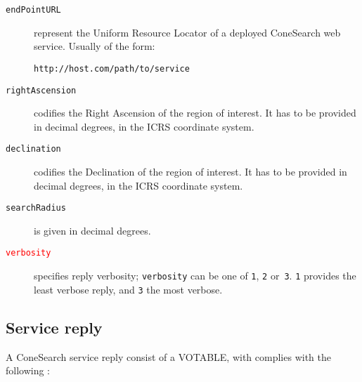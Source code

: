 	\begin{description}
		\item[\texttt{endPointURL}] represent the Uniform Resource 
		Locator of a deployed ConeSearch web service. 
		Usually of the form:
		
		\texttt{http://host.com/path/to/service}

		\item[\texttt{rightAscension}] codifies the Right Ascension 
		of the region of interest. It has to be provided in decimal 
		degrees, in the ICRS coordinate system.

		\item[\texttt{declination}] codifies the Declination of the 
		region of interest. It has to be provided in decimal 
		degrees, in the ICRS coordinate system.

		\item[\texttt{searchRadius}] is given in decimal degrees.

		\item[\textcolor{red}{\texttt{verbosity}}] specifies reply
        verbosity; \texttt{verbosity} can be one of \texttt{1},
        \texttt{2} or~\texttt{3}. \texttt{1} provides the least verbose
        reply, and \texttt{3} the most verbose.
	\end{description}
	
		
	\subsection{Service reply} %
	\label{sub:service_reply_scs}
	
	A ConeSearch service reply consist of a VOTABLE, with complies with 
	the following :

